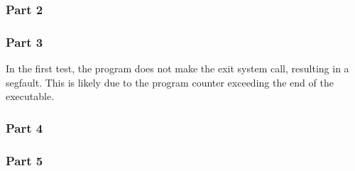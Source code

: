 \documentclass[12pt]{article}
\begin{document}
\subsubsection{Part 2}


\subsubsection{Part 3}
In the first test, the program does not make the exit system call, resulting in a segfault.
This is likely due to the program counter exceeding the end of the executable.


\subsubsection{Part 4}


\subsubsection{Part 5}

\end{document}
